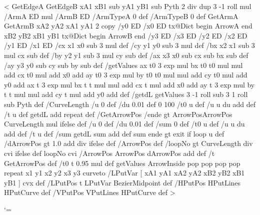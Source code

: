 %
<{%
	GetEdgeA GetEdgeB
	xA1 xB1 sub yA1 yB1 sub
	Pyth 2 div dup 3 -1 roll mul
	/ArmA ED
	mul
	/ArmB ED
	/ArmTypeA 0 def
	/ArmTypeB 0 def
	GetArmA GetArmB
	xA2 yA2 xA1 yA1
	2 copy
	/y0 ED /x0 ED
	tx@Dict begin
		ArrowA
	end
	xB2 yB2 xB1 yB1
	tx@Dict begin
		ArrowB
	end
	/y3 ED /x3 ED /y2 ED /x2 ED /y1 ED /x1 ED
	/cx x1 x0 sub 3 mul def
	/cy y1 y0 sub 3 mul def
	/bx x2 x1 sub 3 mul cx sub def
	/by y2 y1 sub 3 mul cy sub def
	/ax x3 x0 sub cx sub bx sub def
	/ay y3 y0 sub cy sub by sub def
	/getValues {
		ax t0 3 exp mul bx t0 t0 mul mul add cx t0 mul add x0 add
		ay t0 3 exp mul by t0 t0 mul mul add cy t0 mul add y0 add
		ax t 3 exp mul bx t t mul mul add cx t mul add x0 add
	ay t 3 exp mul by t t mul mul add cy t mul add y0 add
	} def
	/getdL {
		getValues
		3 -1 roll sub 3 1 roll sub Pyth
	} def
	/CurveLength {
		/u 0 def
		/du 0.01 def
		0 100 {
			/t0 u def
			/u u du add def
			/t u def
			getdL add
		} repeat } def
	/GetArrowPos {
		/ende \psk@ArrowInsidePos{} gt {ArrowPos}{ArrowPos CurveLength mul} ifelse def
		/u 0 def
		/du 0.01 def
		/sum 0 def
		{
			/t0 u def
			/u u du add def
			/t u def
			/sum getdL sum add def
			sum ende gt {exit} if
		} loop u
	} def
	/dArrowPos  gt {%
		1.0  add div
	}{ \psk@ArrowInsidePos } ifelse def
	/ArrowPos \psk@ArrowInsideOffset\space def
	/loopNo \psk@ArrowInsidePos{} gt {%
		CurveLength \psk@ArrowInsidePos\space div cvi
		}{ \psk@ArrowInsideNo } ifelse def
	loopNo cvi {
		/ArrowPos ArrowPos dArrowPos add def
		/t GetArrowPos def
		/t0 t 0.95 mul def
		getValues
		ArrowInside pop pop pop pop
	} repeat
	x1 y1 x2 y2 x3 y3 curveto
	/LPutVar [ xA1 yA1 xA2 yA2 xB2 yB2 xB1 yB1 ] cvx def
	/LPutPos { t LPutVar BezierMidpoint } def
	/HPutPos { { HPutLines } HPutCurve } def
	/VPutPos { { VPutLines } HPutCurve } def
}>
%

\def\resetArrowOptions{%
  \def\pst@linetype{0}%
  }
%
\resetArrowOptions
%
\catcode`\@=\PstAtCode\relax
%
\endinput
